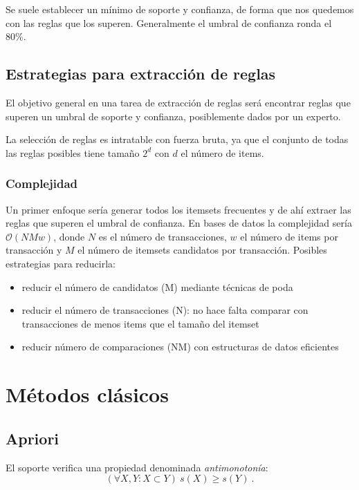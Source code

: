 \documentclass[a4paper,11pt,spanish]{report}
\let\stdsection\section
\let\stdsub\subsection
\let\stdsubsub\subsubsection
\renewcommand{\chapter}{\stdsection}
\renewcommand{\section}{\stdsub}
\renewcommand{\subsection}{\stdsubsub}
\begin{document}
Se suele establecer un mínimo de soporte y confianza, de forma que nos quedemos con las reglas que los superen. Generalmente el umbral de confianza ronda el 80\%.


\section{Estrategias para extracción de reglas}
\label{sec-3-2-3}

El objetivo general en una tarea de extracción de reglas será encontrar reglas que superen un umbral de soporte y confianza, posiblemente dados por un experto.

La selección de reglas es intratable con fuerza bruta, ya que el conjunto de todas las reglas posibles tiene tamaño $2^d$ con $d$ el número de items.

\subsection*{Complejidad}
\label{sec-3-2-3-1}

Un primer enfoque sería generar todos los itemsets frecuentes y de ahí extraer las reglas que superen el umbral de confianza. En bases de datos la complejidad sería $\mathcal O(NMw)$, donde $N$ es el número de transacciones, $w$ el número de items por transacción y $M$ el número de itemsets candidatos por transacción. Posibles estrategias para reducirla:
\begin{itemize}
\item reducir el número de candidatos (M) mediante técnicas de poda
\item reducir el número de transacciones (N): no hace falta comparar con transacciones de menos items que el tamaño del itemset
\item reducir número de comparaciones (NM) con estructuras de datos eficientes
\end{itemize}

\chapter{Métodos clásicos}
\label{sec-3-3}

\section{Apriori}
\label{sec-3-3-1}

El soporte verifica una propiedad denominada \emph{antimonotonía}: $$(\forall X,Y: X\subset Y)\  s(X) \geq s(Y)~.$$
\end{document}
